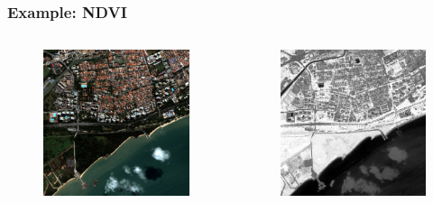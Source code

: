 \documentclass[compress]{beamer}
\begin{document}
\begin{frame}
\frametitle{Example: NDVI}
\begin{columns}
\begin{column}{0.5\textwidth}
\begin{figure}[]
  \includegraphics[width=1.0\textwidth]{radio2-extract-3b.jpg}
\end{figure}
\end{column}
\begin{column}{0.5\textwidth}
\begin{figure}[]
  \includegraphics[width=1.0\textwidth]{Radiometry-NDVI.jpg}
\end{figure}
\end{column}
\end{columns}
\end{frame}
\end{document}
